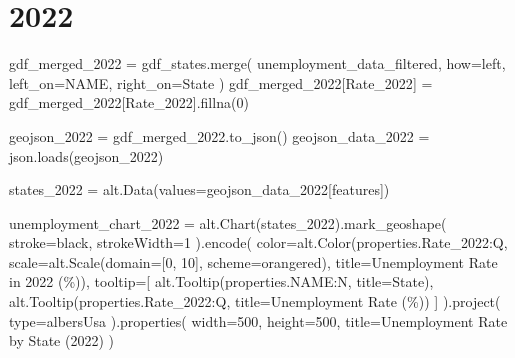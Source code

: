 \documentclass[
  letterpaper,
  DIV=11,
  numbers=noendperiod]{scrartcl}
\newenvironment{Shaded}{\begin{snugshade}}{\end{snugshade}}
\newcommand{\BuiltInTok}[1]{\textcolor[rgb]{0.00,0.23,0.31}{#1}}
\newcommand{\DecValTok}[1]{\textcolor[rgb]{0.68,0.00,0.00}{#1}}
\newcommand{\NormalTok}[1]{\textcolor[rgb]{0.00,0.23,0.31}{#1}}
\newcommand{\OperatorTok}[1]{\textcolor[rgb]{0.37,0.37,0.37}{#1}}
\newcommand{\StringTok}[1]{\textcolor[rgb]{0.13,0.47,0.30}{#1}}
\begin{document}
\section{2022}\label{section-2}

\begin{Shaded}
\begin{Highlighting}[]
\NormalTok{gdf\_merged\_2022 }\OperatorTok{=}\NormalTok{ gdf\_states.merge(}
\NormalTok{    unemployment\_data\_filtered, how}\OperatorTok{=}\StringTok{\textquotesingle{}left\textquotesingle{}}\NormalTok{, left\_on}\OperatorTok{=}\StringTok{\textquotesingle{}NAME\textquotesingle{}}\NormalTok{, right\_on}\OperatorTok{=}\StringTok{\textquotesingle{}State\textquotesingle{}}
\NormalTok{)}
\NormalTok{gdf\_merged\_2022[}\StringTok{\textquotesingle{}Rate\_2022\textquotesingle{}}\NormalTok{] }\OperatorTok{=}\NormalTok{ gdf\_merged\_2022[}\StringTok{\textquotesingle{}Rate\_2022\textquotesingle{}}\NormalTok{].fillna(}\DecValTok{0}\NormalTok{)}

\NormalTok{geojson\_2022 }\OperatorTok{=}\NormalTok{ gdf\_merged\_2022.to\_json()}
\NormalTok{geojson\_data\_2022 }\OperatorTok{=}\NormalTok{ json.loads(geojson\_2022)}

\NormalTok{states\_2022 }\OperatorTok{=}\NormalTok{ alt.Data(values}\OperatorTok{=}\NormalTok{geojson\_data\_2022[}\StringTok{\textquotesingle{}features\textquotesingle{}}\NormalTok{])}

\NormalTok{unemployment\_chart\_2022 }\OperatorTok{=}\NormalTok{ alt.Chart(states\_2022).mark\_geoshape(}
\NormalTok{    stroke}\OperatorTok{=}\StringTok{\textquotesingle{}black\textquotesingle{}}\NormalTok{,}
\NormalTok{    strokeWidth}\OperatorTok{=}\DecValTok{1}
\NormalTok{).encode(}
\NormalTok{    color}\OperatorTok{=}\NormalTok{alt.Color(}\StringTok{\textquotesingle{}properties.Rate\_2022:Q\textquotesingle{}}\NormalTok{, }
\NormalTok{                    scale}\OperatorTok{=}\NormalTok{alt.Scale(domain}\OperatorTok{=}\NormalTok{[}\DecValTok{0}\NormalTok{, }\DecValTok{10}\NormalTok{], scheme}\OperatorTok{=}\StringTok{\textquotesingle{}orangered\textquotesingle{}}\NormalTok{),}
\NormalTok{                    title}\OperatorTok{=}\StringTok{\textquotesingle{}Unemployment Rate in 2022 (\%)\textquotesingle{}}\NormalTok{),}
\NormalTok{    tooltip}\OperatorTok{=}\NormalTok{[}
\NormalTok{        alt.Tooltip(}\StringTok{\textquotesingle{}properties.NAME:N\textquotesingle{}}\NormalTok{, title}\OperatorTok{=}\StringTok{\textquotesingle{}State\textquotesingle{}}\NormalTok{),}
\NormalTok{        alt.Tooltip(}\StringTok{\textquotesingle{}properties.Rate\_2022:Q\textquotesingle{}}\NormalTok{, title}\OperatorTok{=}\StringTok{\textquotesingle{}Unemployment Rate (\%)\textquotesingle{}}\NormalTok{)}
\NormalTok{    ]}
\NormalTok{).project(}
    \BuiltInTok{type}\OperatorTok{=}\StringTok{\textquotesingle{}albersUsa\textquotesingle{}}  
\NormalTok{).properties(}
\NormalTok{    width}\OperatorTok{=}\DecValTok{500}\NormalTok{,}
\NormalTok{    height}\OperatorTok{=}\DecValTok{500}\NormalTok{,}
\NormalTok{    title}\OperatorTok{=}\StringTok{\textquotesingle{}Unemployment Rate by State (2022)\textquotesingle{}}
\NormalTok{)}


\end{Highlighting}
\end{Shaded}
\end{document}

